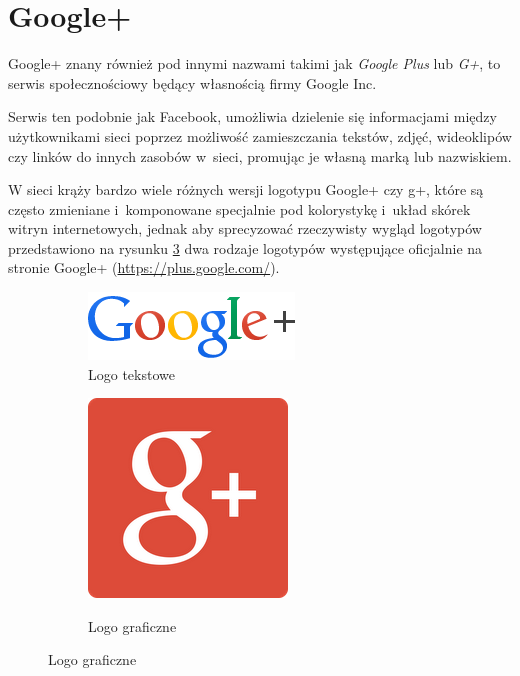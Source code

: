 \section{Google+}
\label{sec:google-plus}
Google+ znany również pod innymi nazwami takimi jak \emph{Google Plus} lub \emph{G+}, to serwis społecznościowy będący własnością firmy Google Inc.

Serwis ten podobnie jak Facebook, umożliwia dzielenie się informacjami między użytkownikami sieci poprzez możliwość zamieszczania tekstów, zdjęć, wideoklipów czy linków do innych zasobów w~sieci, promując je własną marką lub nazwiskiem.

W sieci krąży bardzo wiele różnych wersji logotypu Google+ czy g+, które są często zmieniane i~komponowane specjalnie pod kolorystykę i~układ skórek witryn internetowych, jednak aby sprecyzować rzeczywisty wygląd logotypów przedstawiono na rysunku \ref{fig:logo-google} dwa rodzaje logotypów występujące oficjalnie na stronie Google+ (\url{https://plus.google.com/}).

\begin{figure}[!h]
\centering
\begin{subfigure}{.5\textwidth}
  \centering
  \includegraphics[width=.4\linewidth]{images/googleplus_color.png}
  \caption{Logo tekstowe}
  \label{fig:sub1}
\end{subfigure}%
\begin{subfigure}{.5\textwidth}
  \centering
  \scalebox{0.7}
  {
      \includegraphics[width=.4\linewidth]{images/google-plus-logo.png}
  }  
  \caption{Logo graficzne}
  \label{fig:sub2}
\end{subfigure}
\label{fig:logo-google}
\end{figure}

